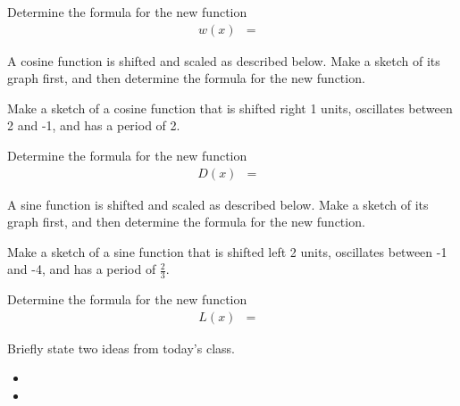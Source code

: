 \begin{problem}
\begin{subproblem}
    \vspace{-0.5em}
    \hspace{-7em}\scalebox{0.72}{}

    \item Determine the formula for the new function
      \begin{eqnarray*}
        w(x) & = &
      \end{eqnarray*}
  \end{subproblem}

\clearpage

\item A cosine function is shifted and scaled as described
  below. Make a sketch of its graph first, and then determine the
  formula for the new function.
  \begin{subproblem}
  \item Make a sketch of a cosine function that is shifted right
    1 units, oscillates between 2 and -1, and has a period of 2.

    \vspace{-0.5em}
    \hspace{-7em}\scalebox{0.72}{}

    \item Determine the formula for the new function
      \begin{eqnarray*}
        D(x) & = &
      \end{eqnarray*}
  \end{subproblem}

\item A sine function is shifted and scaled as described
  below. Make a sketch of its graph first, and then determine the
  formula for the new function.
  \begin{subproblem}
  \item Make a sketch of a sine function that is shifted left
    2 units, oscillates between -1 and -4, and has a period of
    $\frac{2}{3}$.

    \vspace{-0.5em}
    \hspace{-7em}\scalebox{0.72}{}

    \item Determine the formula for the new function
      \begin{eqnarray*}
        L(x) & = &
      \end{eqnarray*}
  \end{subproblem}


\end{problem}

\postClass

\begin{problem}
\item Briefly state two ideas from today's class.
  \begin{itemize}
  \item
  \item
  \end{itemize}
\item
  \begin{subproblem}
    \item
  \end{subproblem}
\end{problem}


